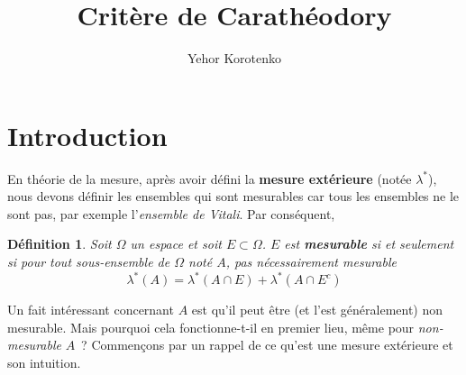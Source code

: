 \documentclass[a4paper]{article}
\author{Yehor Korotenko}
\title{Critère de Carathéodory}
\newtheorem{definition}{Définition}[section]
\begin{document}
\section{Introduction}%
En théorie de la mesure, après avoir défini la \textbf{mesure extérieure} (notée $\lambda^*$), nous devons définir les ensembles qui sont mesurables car tous les ensembles ne le sont pas, par exemple l'\textit{ensemble de Vitali}. Par conséquent,%
\begin{definition}
Soit $\Omega$ un espace et soit $E \subset \Omega$. $E$ est \textbf{mesurable} si et seulement si pour tout sous-ensemble de $\Omega$ noté $A$, pas nécessairement mesurable
\[
\lambda^*(A) = \lambda^*(A \cap E) + \lambda^*(A \cap E^c)
\] 
\end{definition}%
Un fait intéressant concernant $A$ est qu'il peut être (et l'est généralement) non mesurable. Mais pourquoi cela fonctionne-t-il en premier lieu, même pour \textit{non-mesurable} $A$ ? Commençons par un rappel de ce qu'est une mesure extérieure et son intuition.%
\end{document}

